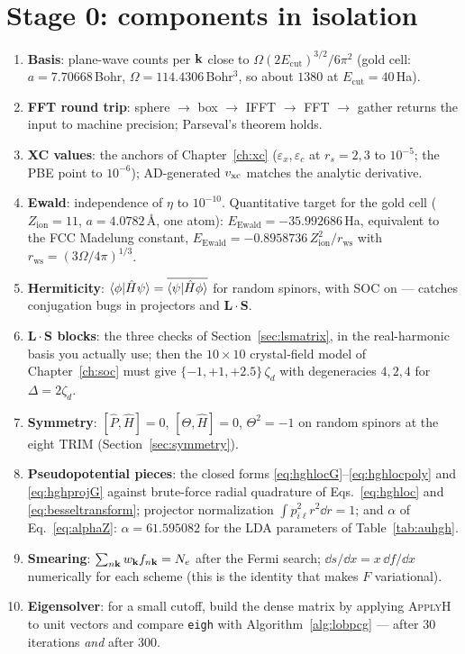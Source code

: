 \section{Stage 0: components in isolation}
\begin{enumerate}[leftmargin=2em]
\item \textbf{Basis}: plane-wave counts per $\mathbf{k}$ close to
$\Omega(2E_{\mathrm{cut}})^{3/2}/6\pi^2$ (gold cell:
$a = 7.70668$\,Bohr, $\Omega = 114.4306$\,Bohr$^3$, so about $1380$ at
$E_{\mathrm{cut}} = 40$\,Ha).
\item \textbf{FFT round trip}: sphere $\to$ box $\to$ IFFT $\to$ FFT $\to$
gather returns the input to machine precision; Parseval's theorem holds.
\item \textbf{XC values}: the anchors of Chapter~\ref{ch:xc}
($\varepsilon_x, \varepsilon_c$ at $r_s = 2, 3$ to $10^{-5}$; the PBE
point to $10^{-6}$); AD-generated $v_{\mathrm{xc}}$ matches the analytic derivative.
\item \textbf{Ewald}: independence of $\eta$ to $10^{-10}$. Quantitative
target for the gold cell ($Z_{\mathrm{ion}} = 11$,
$a = 4.0782$\,\AA, one atom): $E_{\mathrm{Ewald}} = -35.992686$\,Ha,
equivalent to the FCC Madelung constant,
$E_{\mathrm{Ewald}} = -0.8958736\, Z_{\mathrm{ion}}^2 / r_{\mathrm{ws}}$
with $r_{\mathrm{ws}} = (3\Omega/4\pi)^{1/3}$.
\item \textbf{Hermiticity}: $\braket{\phi|\hat H \psi} =
\overline{\braket{\psi | \hat H \phi}}$ for random spinors, with SOC on ---
catches conjugation bugs in projectors and $\mathbf L\cdot\mathbf S$.
\item \textbf{$\mathbf L\cdot\mathbf S$ blocks}: the three checks of
Section~\ref{sec:lsmatrix}, in the real-harmonic basis you actually use;
then the $10\times10$ crystal-field model of Chapter~\ref{ch:soc} must give
$\{-1, +1, +2.5\}\,\zeta_d$ with degeneracies $4, 2, 4$ for $\Delta = 2\zeta_d$.
\item \textbf{Symmetry}: $[\hat P,\hat H]=0$, $[\Theta,\hat H]=0$,
$\Theta^2=-1$ on random spinors at the eight TRIM
(Section~\ref{sec:symmetry}).
\item \textbf{Pseudopotential pieces}: the closed forms
\eqref{eq:hghlocG}--\eqref{eq:hghlocpoly} and \eqref{eq:hghprojG} against
brute-force radial quadrature of Eqs.~\eqref{eq:hghloc} and
\eqref{eq:besseltransform}; projector normalization
$\int p_{i\ell}^2 r^2 \dd r = 1$; and $\alpha$ of Eq.~\eqref{eq:alphaZ}:
$\alpha = 61.595082$ for the LDA parameters of Table~\ref{tab:auhgh}.
\item \textbf{Smearing}: $\sum_{n\mathbf{k}} w_{\mathbf{k}} f_{n\mathbf{k}} = N_e$ after the
Fermi search; $\dd s/\dd x = x\,\dd f/\dd x$ numerically for each scheme
(this is the identity that makes $F$ variational).
\item \textbf{Eigensolver}: for a small cutoff, build the dense matrix by
applying \textsc{ApplyH} to unit vectors and compare \texttt{eigh} with
Algorithm~\ref{alg:lobpcg} --- after 30 iterations \emph{and} after 300.
\end{enumerate}

